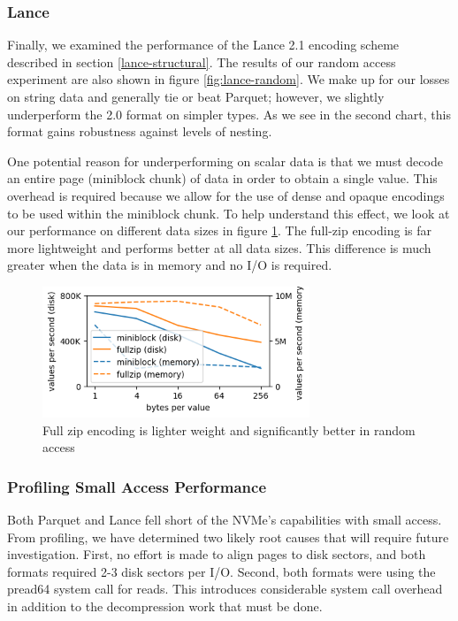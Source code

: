 \documentclass[sigconf, nonacm]{acmart}
\begin{document}
\subsubsection{Lance}

Finally, we examined the performance of the Lance 2.1 encoding scheme described in section \ref{lance-structural}.  The results of our random access experiment are also shown in figure \ref{fig:lance-random}.  We make up for our losses on string data and generally tie or beat Parquet; however, we slightly underperform the 2.0 format on simpler types.  As we see in the second chart, this format gains robustness against levels of nesting.

One potential reason for underperforming on scalar data is that we must decode an entire page (miniblock chunk) of data in order to obtain a single value.  This overhead is required because we allow for the use of dense and opaque encodings to be used within the miniblock chunk.  To help understand this effect, we look at our performance on different data sizes in figure \ref{fig:lance-sized}.  The full-zip encoding is far more lightweight and performs better at all data sizes.  This difference is much greater when the data is in memory and no I/O is required.

\begin{figure}[h]
    \centering
    \includegraphics[width=8cm]{figures/sized_take.png}
    \caption{Full zip encoding is lighter weight and significantly better in random access}
    \label{fig:lance-sized}
\end{figure}

\subsubsection{Profiling Small Access Performance}
\label{small-access-perf}

Both Parquet and Lance fell short of the NVMe's capabilities with small access.  From profiling, we have determined two likely root causes that will require future investigation.  First, no effort is made to align pages to disk sectors, and both formats required 2-3 disk sectors per I/O.  Second, both formats were using the pread64 system call for reads.  This introduces considerable system call overhead in addition to the decompression work that must be done.
\end{document}
